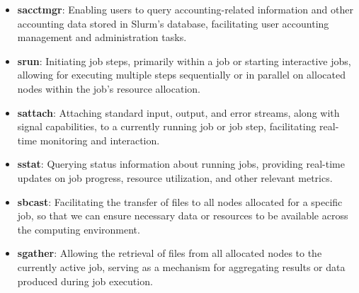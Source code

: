 \begin{itemize}
    \item \textbf{sacctmgr}: Enabling users to query accounting-related information and other accounting data stored in Slurm's database, facilitating user accounting management and administration tasks.
    \item \textbf{srun}: Initiating job steps, primarily within a job or starting interactive jobs, allowing for executing multiple steps sequentially or in parallel on allocated nodes within the job's resource allocation.
    \item \textbf{sattach}: Attaching standard input, output, and error streams, along with signal capabilities, to a currently running job or job step, facilitating real-time monitoring and interaction.
    \item \textbf{sstat}: Querying status information about running jobs, providing real-time updates on job progress, resource utilization, and other relevant metrics.
    \item \textbf{sbcast}: Facilitating the transfer of files to all nodes allocated for a specific job, so that we can ensure necessary data or resources to be available across the computing environment.
    \item \textbf{sgather}: Allowing the retrieval of files from all allocated nodes to the currently active job, serving as a mechanism for aggregating results or data produced during job execution.
\end{itemize}

